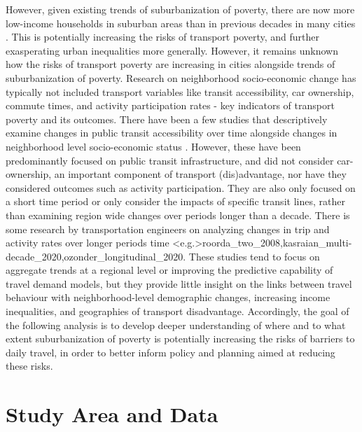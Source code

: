 However, given existing trends of suburbanization of poverty, there are now more low-income households in suburban areas than in previous decades in many cities \cite{ades_are_2012,ades_is_2016,breau_pulling_2018}. This is potentially increasing the risks of transport poverty, and further exasperating urban inequalities more generally. However, it remains unknown how the risks of transport poverty are increasing in cities alongside trends of suburbanization of poverty. Research on neighborhood socio-economic change has typically not included transport variables like transit accessibility, car ownership, commute times, and activity participation rates - key indicators of transport poverty and its outcomes. There have been a few studies that descriptively examine changes in public transit accessibility over time alongside changes in neighborhood level socio-economic status . However, these have been predominantly focused on public transit infrastructure, and did not consider car-ownership, an important component of transport (dis)advantage, nor have they considered outcomes such as activity participation. They are also only focused on a short time period or only consider the impacts of specific transit lines, rather than examining region wide changes over periods longer than a decade. There is some research by transportation engineers on analyzing changes in trip and activity rates over longer periods time \shortcite<e.g.>{roorda_two_2008,kasraian_multi-decade_2020,ozonder_longitudinal_2020}. 
These studies tend to focus on aggregate trends at a regional level or improving the predictive capability of travel demand models, but they provide little insight on the links between travel behaviour with neighborhood-level demographic changes, increasing income inequalities, and geographies of transport disadvantage. Accordingly, the goal of the following analysis is to develop deeper understanding of where and to what extent suburbanization of poverty is potentially increasing the risks of barriers to daily travel, in order to better inform policy and planning aimed at reducing these risks. 





\section{Study Area and Data}

